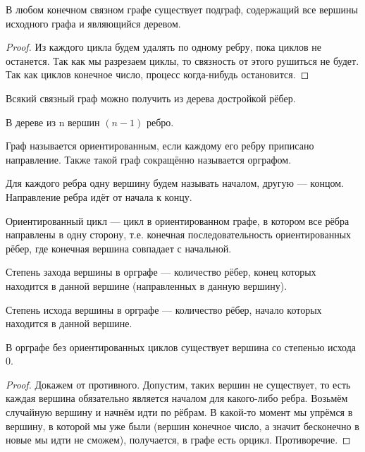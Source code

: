 \begin{proposition}
В любом конечном связном графе существует подграф, содержащий все вершины
исходного графа и являющийся деревом.	
\end{proposition}
\begin{proof}
Из каждого цикла будем удалять по одному ребру, пока циклов не останется. Так
как мы разрезаем циклы, то связность от этого рушиться не будет. Так как циклов
конечное число, процесс когда-нибудь остановится.
\end{proof}
\begin{corollary}
Всякий связный граф можно получить из дерева достройкой рёбер.
\end{corollary}
\begin{proposition}
	В дереве из n вершин $(n-1)$ ребро.
\end{proposition}
\begin{definition}
	Граф называется ориентированным, если каждому его ребру приписано
	направление. Также такой граф сокращённо называется орграфом.
	
	Для каждого ребра одну вершину будем называть началом, другую ---
	концом. Направление ребра идёт от начала к концу.
\end{definition}
\begin{definition}
	Ориентированный цикл --- цикл в ориентированном графе, в котором все
	рёбра направлены в одну сторону, т.е. конечная последовательность
	ориентированных рёбер, где конечная вершина совпадает с начальной.
\end{definition}
\begin{definition}
	Степень захода вершины в орграфе --- количество рёбер, конец которых
	находится в данной вершине (направленных в данную вершину).

	Степень исхода вершины в орграфе --- количество рёбер, начало которых
	находится в данной вершине.
\end{definition}
\begin{lemma}
В орграфе без ориентированных циклов существует вершина со степенью исхода 0. 
\end{lemma}
\begin{proof}
Докажем от противного. Допустим, таких вершин не существует, то есть каждая
вершина обязательно является началом для какого-либо ребра. Возьмём случайную
вершину и начнём идти по рёбрам. В какой-то момент мы упрёмся в вершину, в
которой мы уже были (вершин конечное число, а значит бесконечно в новые мы идти
не сможем), получается, в графе есть орцикл. Противоречие.
\end{proof}

